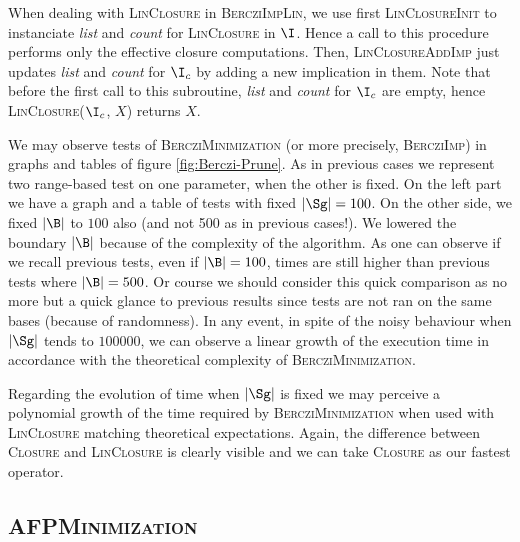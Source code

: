 When dealing with \textsc{LinClosure} in \textsc{BercziImpLin}, we use first \textsc{LinClosureInit} to instanciate 
\textit{list} and \textit{count} for \textsc{LinClosure} in $\I$. Hence a call
to this procedure performs only the effective closure computations. Then, 
\textsc{LinClosureAddImp} just updates \textit{list} and \textit{count} for $\I_c$ by adding a new implication in them. Note that before the first call to
this subroutine, \textit{list} and \textit{count} for $\I_c$ are empty, hence
\textsc{LinClosure}($\I_c$, $X$) returns $X$.

\vspace{1.2em}

We may observe tests of \textsc{BercziMinimization} (or more precisely, \textsc{BercziImp}) in graphs and tables of figure \ref{fig:Berczi-Prune}. As in previous cases we represent two range-based test on one parameter, when the other is fixed. On the left part we have a graph and a table of tests with fixed $|\Sg| = 100$. On the other side, we fixed $|\B|$ to $100$ also (and not 500 as in previous cases!). We lowered the boundary $|\B|$ because of the complexity of the algorithm. As one can observe if we recall previous tests, even if $|\B| = 100$, times are still higher than previous tests where $|\B| = 500$. Or course we should consider this quick comparison as no more but a quick glance to previous results since tests are not ran on the same bases (because of randomness). In any event, in spite of the noisy behaviour when $|\Sg|$ tends to $100000$, we can observe a linear growth of the execution time in accordance with the theoretical complexity of \textsc{BercziMinimization}.

\begin{figure}[ht!]
	
\end{figure}

\vspace{1.2em}

Regarding the evolution of time when $|\Sg|$ is fixed we  may perceive a polynomial growth of the time required by
\textsc{BercziMinimization} when used with \textsc{LinClosure} matching theoretical expectations. Again, the difference between \textsc{Closure} and \textsc{LinClosure} is clearly visible and we can take \textsc{Closure} as our fastest operator.

\subsection{\textsc{AFPMinimization}}

